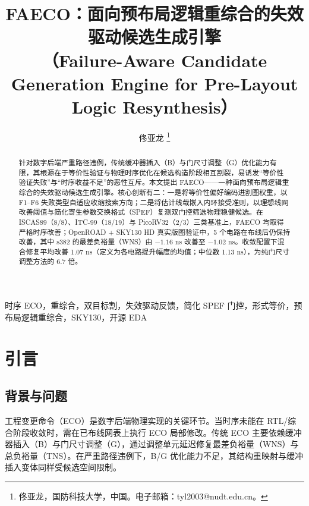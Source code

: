 \documentclass[journal]{IEEEtran}
\title{FAECO：面向预布局逻辑重综合的失效驱动候选生成引擎\\
（Failure-Aware Candidate Generation Engine for Pre-Layout Logic Resynthesis）}
\author{佟亚龙%
\thanks{佟亚龙，国防科技大学，中国。电子邮箱：tyl2003@nudt.edu.cn。}}
\begin{document}
\maketitle

\sloppy

\begin{abstract}
针对数字后端严重路径违例，传统缓冲器插入（B）与门尺寸调整（G）优化能力有限，其根源在于等价性验证与物理时序优化在候选构造阶段相互割裂，易诱发“等价性验证失败”与“时序收益不足”的恶性互斥。本文提出 FAECO——一种面向预布局逻辑重综合的失效驱动候选生成引擎。核心创新有二：一是将等价性偏好编码进割图权重，以 F1--F6 失败类型自适应收缩搜索方向；二是将估计线载嵌入内环接受准则，以理想线网改善阈值与简化寄生参数交换格式（SPEF）复测双门控筛选物理稳健候选。在 ISCAS89（8/8）、ITC-99（18/19）与 PicoRV32（2/3）三类基准上，FAECO 均取得严格时序改善；OpenROAD + SKY130 HD 真实版图验证中，5 个电路在布线后仍保持改善，其中 s382 的最差负裕量（WNS）由 $-1.16$ ns 改善至 $-1.02$ ns。收敛配置下混合修复平均改善 1.07 ns（定义为各电路提升幅度的均值；中位数 1.13 ns），为纯门尺寸调整方法的 6.7 倍。
\end{abstract}

\begin{IEEEkeywords}
时序 ECO，重综合，双目标割，失效驱动反馈，简化 SPEF 门控，形式等价，预布局逻辑重综合，SKY130，开源 EDA
\end{IEEEkeywords}

\section{引言}

\subsection{背景与问题}

工程变更命令（ECO）是数字后端物理实现的关键环节。当时序未能在 RTL/综合阶段收敛时，需在已布线网表上执行 ECO 局部修改。传统 ECO 主要依赖缓冲器插入（B）与门尺寸调整（G），通过调整单元延迟修复最差负裕量（WNS）与总负裕量（TNS）。在严重路径违例下，B/G 优化能力不足，其结构重映射与缓冲插入变体同样受候选空间限制\cite{chen2012metal,chen2012fixability,liang2012buffer,ho2010eco}。
\end{document}
